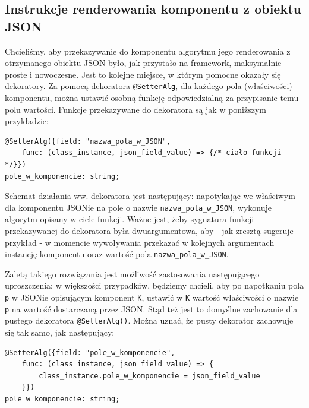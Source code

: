 \documentclass[licencjacka]{pracamgr}
\begin{document}
\subsection{Instrukcje renderowania komponentu z obiektu JSON}
Chcieliśmy, aby przekazywanie do komponentu algorytmu jego renderowania z otrzymanego obiektu JSON było,
jak przystało na framework, maksymalnie proste i nowoczesne.
Jest to kolejne miejsce, w którym pomocne okazały się dekoratory.
Za pomocą dekoratora \texttt{@SetterAlg}, dla każdego pola (właściwości) komponentu,
można ustawić osobną funkcję odpowiedzialną za przypisanie temu polu wartości.
Funkcje przekazywane do dekoratora są jak w poniższym przykładzie:
\begin{verbatim}
@SetterAlg({field: "nazwa_pola_w_JSON", 
    func: (class_instance, json_field_value) => {/* ciało funkcji */}})
pole_w_komponencie: string;
\end{verbatim}

Schemat działania ww. dekoratora jest następujący: napotykając we właściwym dla komponentu JSONie na pole o nazwie
\texttt{nazwa_pola_w_JSON}, wykonuje algorytm opisany w ciele funkcji. Ważne jest, żeby sygnatura funkcji przekazywanej do dekoratora była dwuargumentowa, aby - jak zresztą sugeruje przykład - w momencie wywoływania przekazać w kolejnych argumentach instancję komponentu oraz wartość pola \texttt{nazwa_pola_w_JSON}.

Zaletą takiego rozwiązania jest możliwość zastosowania następującego uproszczenia: w większości przypadków, będziemy chcieli, aby po napotkaniu pola \texttt{p} w JSONie opisującym komponent \texttt{K}, ustawić w \texttt{K} wartość właściwości o nazwie \texttt{p} na wartość dostarczaną przez JSON. Stąd też jest to domyślne zachowanie dla pustego dekoratora
\texttt{@SetterAlg()}. Można uznać, że pusty dekorator zachowuje się tak samo, jak następujący:

\begin{verbatim}
@SetterAlg({field: "pole_w_komponencie", 
    func: (class_instance, json_field_value) => { 
        class_instance.pole_w_komponencie = json_field_value 
    }})
pole_w_komponencie: string;
\end{verbatim}
\end{document}
